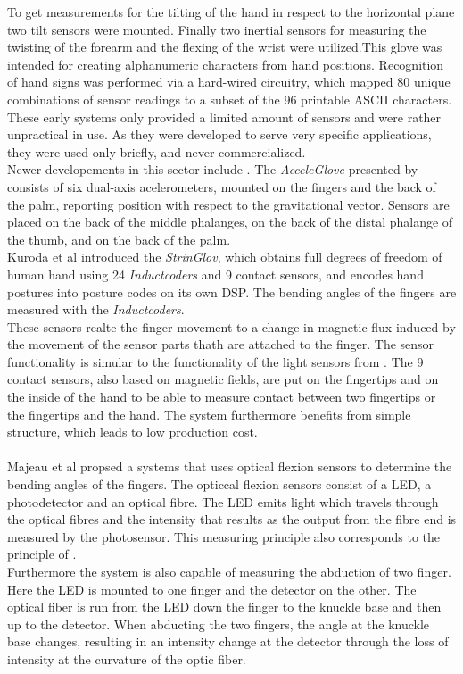 To get measurements  for the tilting of the hand in respect to the horizontal plane two tilt sensors were mounted. Finally two inertial sensors for measuring the twisting of the forearm and the flexing of the wrist were utilized.This glove was intended for creating alphanumeric characters from hand positions. Recognition of hand signs was performed via a hard-wired circuitry, which mapped 80 unique combinations of sensor readings to a subset of the 96 printable ASCII characters.
\\These early systems only provided a limited amount of sensors and were rather unpractical in use. As they were developed to serve very specific applications,  they were used only briefly, and never commercialized.\\
Newer developements in this sector include \cite{Kuroda.2004,HernandezRebollar.2002,Majeau.2012}. The \textit{AcceleGlove} presented by \cite{HernandezRebollar.2002} consists of six dual-axis acelerometers, mounted on the fingers and the back of the palm, reporting position with respect to the gravitational vector. Sensors are placed on the back of the middle phalanges, on the back of the distal phalange of the thumb, and on the back of the palm.
\\Kuroda et al \cite{Kuroda.2004} introduced the \textit{StrinGlov}, which obtains full degrees of freedom of human hand using 24 \textit{Inductcoders} and 9 contact sensors, and encodes hand postures into posture codes on its own DSP. The bending angles of the fingers are measured with the \textit{Inductcoders}.\\These sensors realte the finger movement to a change in magnetic flux induced by the movement of the sensor parts thath are attached to the finger. The sensor functionality is simular to the functionality of the light sensors from \cite{ThomasA.DeFanti.1977}. The 9 contact sensors, also based on magnetic fields,  are put on the fingertips and on the inside of the hand to be able to measure contact between two fingertips or the fingertips and the hand. The system furthermore benefits from simple structure, which leads to low production cost. \\\\
Majeau et al \cite{Majeau.2012} propsed a systems that uses optical flexion sensors to determine the bending angles of the fingers. The opticcal flexion sensors consist of a LED, a photodetector and an optical fibre. The LED emits light which travels through the optical fibres and the intensity that results as the output from the fibre end is measured by the photosensor. This measuring principle also corresponds to the principle of \cite{ThomasA.DeFanti.1977}. \\Furthermore the system is also capable of measuring the abduction of two finger. Here the LED is mounted to one finger and the detector on the other. The optical fiber is run from the LED down the finger to the knuckle base and then up to the detector. When abducting the two fingers, the angle at the knuckle base changes, resulting in an intensity change at the detector through the loss of intensity at the curvature of the optic fiber.
